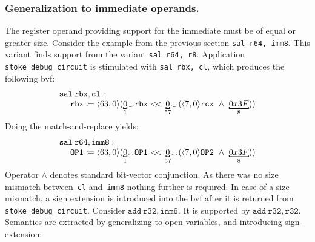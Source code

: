 \subsubsection*{Generalization to immediate operands.} 
The register operand providing support for the immediate must be of equal or greater size. Consider the example from the previous section \texttt{sal r64, imm8}. 
This variant finds support from the variant \texttt{sal r64, r8}.
Application \texttt{stoke\_debug\_circuit} is stimulated with \texttt{sal rbx, cl}, which produces the following bvf:
\[
\begin{array}{llcl}
\mathtt{sal\hspace{0.5ex} rbx, cl}: \\
 \hspace{3ex}\mathtt{rbx} \coloneqq  \langle 63,0\rangle(\bitmoded{1}{0} {_\smile} \mathtt{rbx} <\!< \bitmoded{57}{0} {_\smile} (\langle 7,0\rangle\mathtt{rcx} ~\wedge~ \bitmoded{8}{0x3F}))
\end{array}
\]
Doing the match-and-replace yields:
\[
\begin{array}{llcl}
\mathtt{sal\hspace{0.5ex}} \mathtt{r64, imm8}: \\
 \hspace{3ex} \mathtt{OP1}  \coloneqq  \langle 63,0\rangle(\bitmoded{1}{0} {_\smile} \mathtt{OP1} <\!< \bitmoded{57}{0} {_\smile} (\langle 7,0\rangle\mathtt{OP2} ~\wedge~ \bitmoded{8}{0x3F}))
\end{array}
\]
Operator $\wedge$ denotes standard bit-vector conjunction. 
As there was no size mismatch between~\texttt{cl} and~\texttt{imm8} nothing further is required.
In case of a size mismatch, a sign extension is introduced into the bvf after it is returned from \texttt{stoke\_debug\_circuit}.
Consider $\mathtt{add~r32, imm8}$.
It is supported by $\mathtt{add~r32, r32}$.
Semantics are extracted by generalizing to open variables, and introducing sign-extension:
